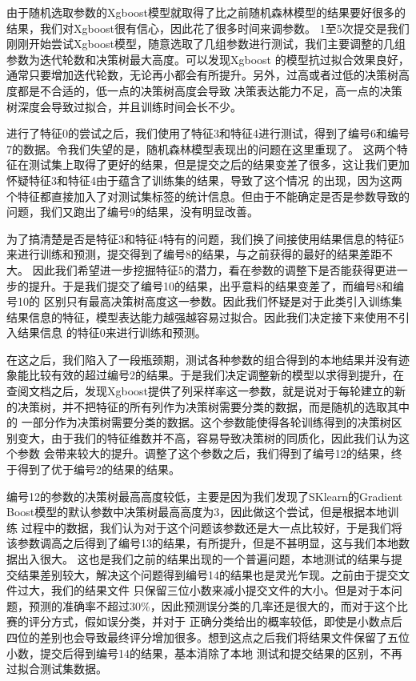由于随机选取参数的Xgboost模型就取得了比之前随机森林模型的结果要好很多的结果，我们对Xgboost很有信心，因此花了很多时间来调参数。
1至5次提交是我们刚刚开始尝试Xgboost模型，随意选取了几组参数进行测试，我们主要调整的几组参数为迭代轮数和决策树最大高度。可以发现Xgboost
的模型抗过拟合效果良好，通常只要增加迭代轮数，无论再小都会有所提升。另外，过高或者过低的决策树高度都是不合适的，低一点的决策树高度会导致
决策表达能力不足，高一点的决策树深度会导致过拟合，并且训练时间会长不少。

进行了特征0的尝试之后，我们使用了特征3和特征4进行测试，得到了编号6和编号7的数据。令我们失望的是，随机森林模型表现出的问题在这里重现了。
这两个特征在测试集上取得了更好的结果，但是提交之后的结果变差了很多，这让我们更加怀疑特征3和特征4由于蕴含了训练集的结果，导致了这个情况
的出现，因为这两个特征都直接加入了对测试集标签的统计信息。但由于不能确定是否是参数导致的问题，我们又跑出了编号9的结果，没有明显改善。

为了搞清楚是否是特征3和特征4特有的问题，我们换了间接使用结果信息的特征5来进行训练和预测，提交得到了编号8的结果，与之前获得的最好的结果差距不大。
因此我们希望进一步挖掘特征5的潜力，看在参数的调整下是否能获得更进一步的提升。于是我们提交了编号10的结果，出乎意料的结果变差了，而编号8和编号10的
区别只有最高决策树高度这一参数。因此我们怀疑是对于此类引入训练集结果信息的特征，模型表达能力越强越容易过拟合。因此我们决定接下来使用不引入结果信息
的特征0来进行训练和预测。

在这之后，我们陷入了一段瓶颈期，测试各种参数的组合得到的本地结果并没有迹象能比较有效的超过编号2的结果。于是我们决定调整新的模型以求得到提升，在
查阅文档之后，发现Xgboost提供了列采样率这一参数，就是说对于每轮建立的新的决策树，并不把特征的所有列作为决策树需要分类的数据，而是随机的选取其中的
一部分作为决策树需要分类的数据。这个参数能使得各轮训练得到的决策树区别变大，由于我们的特征维数并不高，容易导致决策树的同质化，因此我们认为这个参数
会带来较大的提升。调整了这个参数之后，我们得到了编号12的结果，终于得到了优于编号2的结果的结果。

编号12的参数的决策树最高高度较低，主要是因为我们发现了SKlearn的Gradient Boost模型的默认参数中决策树最高高度为3，因此做这个尝试，但是根据本地训练
过程中的数据，我们认为对于这个问题该参数还是大一点比较好，于是我们将该参数调高之后得到了编号13的结果，有所提升，但是不甚明显，这与我们本地数据出入很大。
这也是我们之前的结果出现的一个普遍问题，本地测试的结果与提交结果差别较大，解决这个问题得到编号14的结果也是灵光乍现。之前由于提交文件过大，我们的结果文件
只保留三位小数来减小提交文件的大小。但是对于本问题，预测的准确率不超过30\%，因此预测误分类的几率还是很大的，而对于这个比赛的评分方式，假如误分类，并对于
正确分类给出的概率较低，即使是小数点后四位的差别也会导致最终评分增加很多。想到这点之后我们将结果文件保留了五位小数，提交后得到编号14的结果，基本消除了本地
测试和提交结果的区别，不再过拟合测试集数据。

